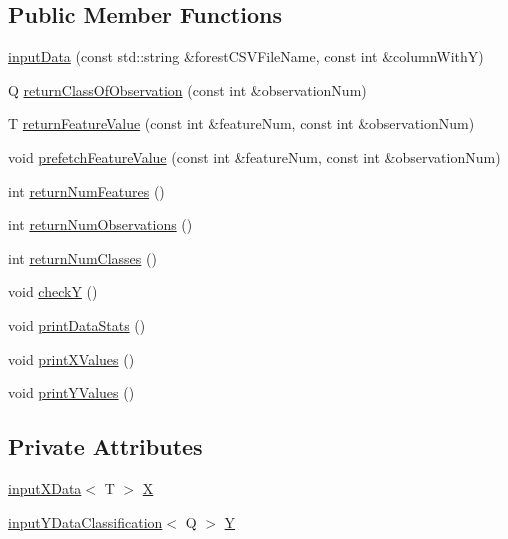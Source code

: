 \subsection*{Public Member Functions}
\begin{DoxyCompactItemize}
\item 
\hyperlink{classinputData_a5247a5643a16302f98d913a5d705d866}{input\+Data} (const std\+::string \&forest\+C\+S\+V\+File\+Name, const int \&column\+WithY)
\item 
Q \hyperlink{classinputData_ab6ba59207888898f9c008578dd59cf46}{return\+Class\+Of\+Observation} (const int \&observation\+Num)
\item 
T \hyperlink{classinputData_a8914408ce5de02c3786dc7ff61f6cfab}{return\+Feature\+Value} (const int \&feature\+Num, const int \&observation\+Num)
\item 
void \hyperlink{classinputData_af1637032057ee7aa01a19bd8d7583a95}{prefetch\+Feature\+Value} (const int \&feature\+Num, const int \&observation\+Num)
\item 
int \hyperlink{classinputData_a8fbb9ac952f73f65295eeb9bf8c3b01a}{return\+Num\+Features} ()
\item 
int \hyperlink{classinputData_af2ac0a8c7e0bfcdf1de1ea521eadc7af}{return\+Num\+Observations} ()
\item 
int \hyperlink{classinputData_aa87e9181995fe0f15fae83617dba2808}{return\+Num\+Classes} ()
\item 
void \hyperlink{classinputData_aa40d52511c8ccdad2011fef47d0200a2}{checkY} ()
\item 
void \hyperlink{classinputData_ab6fad11a73fdfc33bbfa7a90b05e43b7}{print\+Data\+Stats} ()
\item 
void \hyperlink{classinputData_a23adc6270b0904e92b6e87683c12b902}{print\+X\+Values} ()
\item 
void \hyperlink{classinputData_aa5624d9fe35194b617fb21051a49a2c4}{print\+Y\+Values} ()
\end{DoxyCompactItemize}
\subsection*{Private Attributes}
\begin{DoxyCompactItemize}
\item 
\hyperlink{classinputXData}{input\+X\+Data}$<$ T $>$ \hyperlink{classinputData_a31bffca53fea1a24c237e543cc5489a0}{X}
\item 
\hyperlink{classinputYDataClassification}{input\+Y\+Data\+Classification}$<$ Q $>$ \hyperlink{classinputData_a03b936fe0070cee08153cb4853003ab4}{Y}
\end{DoxyCompactItemize}


